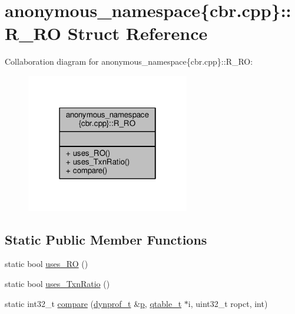 \hypertarget{structanonymous__namespace_02cbr_8cpp_03_1_1R__RO}{\section{anonymous\-\_\-namespace\{cbr.\-cpp\}\-:\-:R\-\_\-\-R\-O Struct Reference}
\label{structanonymous__namespace_02cbr_8cpp_03_1_1R__RO}
}


Collaboration diagram for anonymous\-\_\-namespace\{cbr.\-cpp\}\-:\-:R\-\_\-\-R\-O\-:
\nopagebreak
\begin{figure}[H]
\begin{center}
\leavevmode
\includegraphics[width=202pt]{structanonymous__namespace_02cbr_8cpp_03_1_1R__RO__coll__graph}
\end{center}
\end{figure}
\subsection*{Static Public Member Functions}
\begin{DoxyCompactItemize}
\item 
static bool \hyperlink{structanonymous__namespace_02cbr_8cpp_03_1_1R__RO_af87c390d8c41c22a9584a39c0cd08737}{uses\-\_\-\-R\-O} ()
\item 
static bool \hyperlink{structanonymous__namespace_02cbr_8cpp_03_1_1R__RO_ae504af75d70c83b67f9ae6d2e3c7de28}{uses\-\_\-\-Txn\-Ratio} ()
\item 
static int32\-\_\-t \hyperlink{structanonymous__namespace_02cbr_8cpp_03_1_1R__RO_ae230bfc5b5a573e19a238932c4b7b8a9}{compare} (\hyperlink{structstm_1_1dynprof__t}{dynprof\-\_\-t} \&\hyperlink{counted__ptr_8hpp_a5c9f59d7c24e3fd6ceae319a968fc3e0}{p}, \hyperlink{structstm_1_1qtable__t}{qtable\-\_\-t} $\ast$i, uint32\-\_\-t ropct, int)
\end{DoxyCompactItemize}


